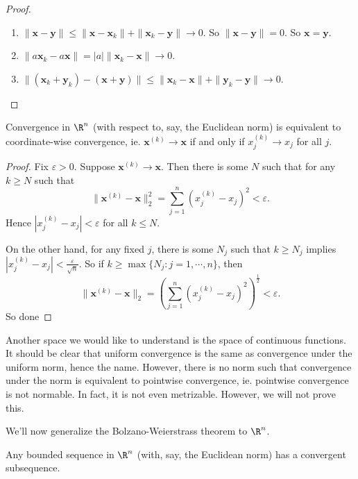 \documentclass[a4paper]{article}
\begin{document}
\begin{proof}\leavevmode
  \begin{enumerate}
    \item $\|\mathbf{x} - \mathbf{y}\| \leq \|\mathbf{x} - \mathbf{x}_k\| + \|\mathbf{x}_k - \mathbf{y}\| \to 0$. So $\|\mathbf{x} - \mathbf{y}\| = 0$. So $\mathbf{x} = \mathbf{y}$.
    \item $\|a \mathbf{x}_k - a \mathbf{x}\| = |a|\|\mathbf{x}_k - \mathbf{x}\| \to 0$.
  \item $\|(\mathbf{x}_k + \mathbf{y}_k) - (\mathbf{x} + \mathbf{y})\| \leq \|\mathbf{x}_k - \mathbf{x}\| + \|\mathbf{y}_k - \mathbf{y}\| \to 0$.
  \end{enumerate}
\end{proof}

\begin{prop}
  Convergence in $\R^n$ (with respect to, say, the Euclidean norm) is equivalent to coordinate-wise convergence, ie. $\mathbf{x}^{(k)} \to \mathbf{x}$ if and only if $x^{(k)}_j \to x_j$ for all $j$.
\end{prop}

\begin{proof}
  Fix $\varepsilon > 0$. Suppose $\mathbf{x}^{(k)} \to \mathbf{x}$. Then there is some $N$ such that for any $k \geq N$ such that
  \[
    \|\mathbf{x}^{(k)} - \mathbf{x}\|_2^2 = \sum_{j = 1}^n (x_j^{(k)} - x_j)^2 < \varepsilon.
  \]
  Hence $|x_j^{(k)} - x_j| < \varepsilon$ for all $k \leq N$.

  On the other hand, for any fixed $j$, there is some $N_j$ such that $k \geq N_j$ implies $|x_j^{(k)} - x_j| < \frac{\varepsilon}{\sqrt{n}}$. So if $k \geq \max\{N_j: j = 1, \cdots, n\}$, then
  \[
    \|\mathbf{x}^{(k)} - \mathbf{x}\|_2 = \left(\sum_{j = 1}^n (x_j^{(k)} - x_j)^2\right)^{\frac{1}{2}} < \varepsilon.
  \]
  So done
\end{proof}

Another space we would like to understand is the space of continuous functions. It should be clear that uniform convergence is the same as convergence under the uniform norm, hence the name. However, there is no norm such that convergence under the norm is equivalent to pointwise convergence, ie. pointwise convergence is not normable. In fact, it is not even metrizable. However, we will not prove this.

We'll now generalize the Bolzano-Weierstrass theorem to $\R^n$.
\begin{thm}
  Any bounded sequence in $\R^n$ (with, say, the Euclidean norm) has a convergent subsequence.
\end{thm}
\end{document}
